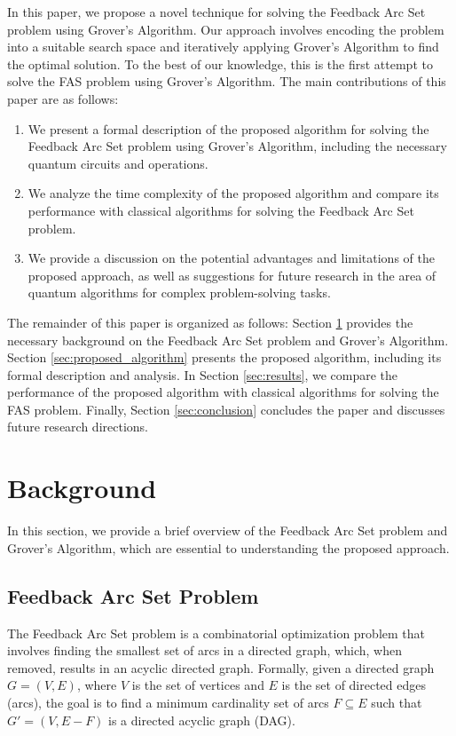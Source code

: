 In this paper, we propose a novel technique for solving the Feedback Arc Set problem using Grover's Algorithm. Our approach involves encoding the problem into a suitable search space and iteratively applying Grover's Algorithm to find the optimal solution. To the best of our knowledge, this is the first attempt to solve the FAS problem using Grover's Algorithm. The main contributions of this paper are as follows:

\begin{enumerate}
    \item We present a formal description of the proposed algorithm for solving the Feedback Arc Set problem using Grover's Algorithm, including the necessary quantum circuits and operations.
    
    \item We analyze the time complexity of the proposed algorithm and compare its performance with classical algorithms for solving the Feedback Arc Set problem.
    
    \item We provide a discussion on the potential advantages and limitations of the proposed approach, as well as suggestions for future research in the area of quantum algorithms for complex problem-solving tasks.
\end{enumerate}

The remainder of this paper is organized as follows: Section \ref{sec:background} provides the necessary background on the Feedback Arc Set problem and Grover's Algorithm. Section \ref{sec:proposed_algorithm} presents the proposed algorithm, including its formal description and analysis. In Section \ref{sec:results}, we compare the performance of the proposed algorithm with classical algorithms for solving the FAS problem. Finally, Section \ref{sec:conclusion} concludes the paper and discusses future research directions.

\section{Background}
\label{sec:background}
In this section, we provide a brief overview of the Feedback Arc Set problem and Grover's Algorithm, which are essential to understanding the proposed approach.

\subsection{Feedback Arc Set Problem}
The Feedback Arc Set problem is a combinatorial optimization problem that involves finding the smallest set of arcs in a directed graph, which, when removed, results in an acyclic directed graph. Formally, given a directed graph $G=(V,E)$, where $V$ is the set of vertices and $E$ is the set of directed edges (arcs), the goal is to find a minimum cardinality set of arcs $F \subseteq E$ such that $G'=(V,E-F)$ is a directed acyclic graph (DAG).

